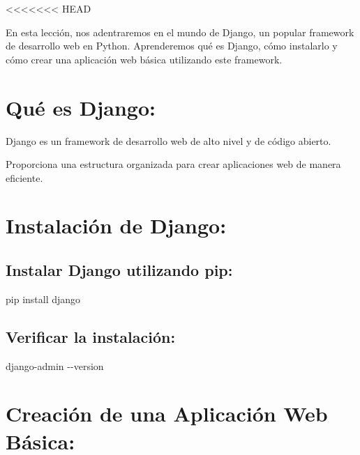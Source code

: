 \documentclass[
  a4paper,
  onepage,
  openany]{scrreprt}
\newenvironment{Shaded}{\begin{snugshade}}{\end{snugshade}}
\newcommand{\AttributeTok}[1]{\textcolor[rgb]{0.40,0.45,0.13}{#1}}
\newcommand{\ExtensionTok}[1]{\textcolor[rgb]{0.00,0.23,0.31}{#1}}
\newcommand{\NormalTok}[1]{\textcolor[rgb]{0.00,0.23,0.31}{#1}}
\begin{document}
\textless\textless\textless\textless\textless\textless\textless{} HEAD

En esta lección, nos adentraremos en el mundo de Django, un popular
framework de desarrollo web en Python. Aprenderemos qué es Django, cómo
instalarlo y cómo crear una aplicación web básica utilizando este
framework.

\hypertarget{quuxe9-es-django}{%
\section{Qué es Django:}\label{quuxe9-es-django}}

Django es un framework de desarrollo web de alto nivel y de código
abierto.

Proporciona una estructura organizada para crear aplicaciones web de
manera eficiente.

\hypertarget{instalaciuxf3n-de-django}{%
\section{Instalación de Django:}\label{instalaciuxf3n-de-django}}

\hypertarget{instalar-django-utilizando-pip}{%
\subsection{Instalar Django utilizando
pip:}\label{instalar-django-utilizando-pip}}

\begin{Shaded}
\begin{Highlighting}[]
\ExtensionTok{pip}\NormalTok{ install django}
\end{Highlighting}
\end{Shaded}

\hypertarget{verificar-la-instalaciuxf3n}{%
\subsection{Verificar la
instalación:}\label{verificar-la-instalaciuxf3n}}

\begin{Shaded}
\begin{Highlighting}[]
\ExtensionTok{django{-}admin} \AttributeTok{{-}{-}version}
\end{Highlighting}
\end{Shaded}

\hypertarget{creaciuxf3n-de-una-aplicaciuxf3n-web-buxe1sica}{%
\section{Creación de una Aplicación Web
Básica:}\label{creaciuxf3n-de-una-aplicaciuxf3n-web-buxe1sica}}
\end{document}
